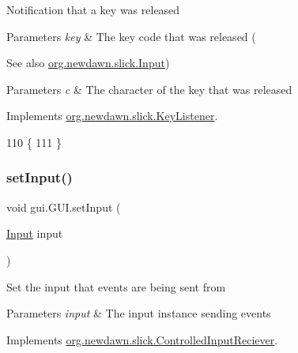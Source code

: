 Notification that a key was released


\begin{DoxyParams}{Parameters}
{\em key} & The key code that was released (\\
\hline
\end{DoxyParams}
\begin{DoxySeeAlso}{See also}
\mbox{\hyperlink{classorg_1_1newdawn_1_1slick_1_1_input}{org.\+newdawn.\+slick.\+Input}}) 
\end{DoxySeeAlso}

\begin{DoxyParams}{Parameters}
{\em c} & The character of the key that was released \\
\hline
\end{DoxyParams}


Implements \mbox{\hyperlink{interfaceorg_1_1newdawn_1_1slick_1_1_key_listener_a474673b59bc77266bcef3c261c26ee2b}{org.\+newdawn.\+slick.\+Key\+Listener}}.


\begin{DoxyCode}
110                                              \{
111     \}
\end{DoxyCode}
\mbox{\label{classgui_1_1_g_u_i_a58f6de4eaf3f446b6a6efd30121091df}} 
\subsubsection{\texorpdfstring{set\+Input()}{setInput()}}
{\footnotesize\ttfamily void gui.\+G\+U\+I.\+set\+Input (\begin{DoxyParamCaption}\item[{\mbox{\hyperlink{classorg_1_1newdawn_1_1slick_1_1_input}{Input}}}]{input }\end{DoxyParamCaption})\hspace{0.3cm}{\ttfamily [inline]}}

Set the input that events are being sent from


\begin{DoxyParams}{Parameters}
{\em input} & The input instance sending events \\
\hline
\end{DoxyParams}


Implements \mbox{\hyperlink{interfaceorg_1_1newdawn_1_1slick_1_1_controlled_input_reciever_ab838ca221a429b05c0b53aea9b4fe72f}{org.\+newdawn.\+slick.\+Controlled\+Input\+Reciever}}.


